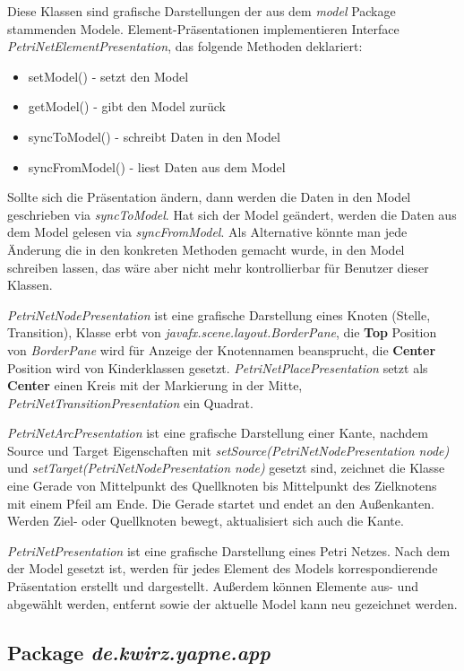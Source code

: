 \documentclass[12pt]{article}
\begin{document}
Diese Klassen sind grafische Darstellungen der aus dem \emph{model} Package stammenden Modele. Element-Präsentationen implementieren Interface
\emph{PetriNetElementPresentation}, das folgende Methoden deklariert:
\begin{itemize}
\item{setModel() - setzt den Model}
\item{getModel() - gibt den Model zurück}
\item{syncToModel() - schreibt Daten in den Model}
\item{syncFromModel() - liest Daten aus dem Model}
\end{itemize}
Sollte sich die Präsentation ändern, dann werden die Daten in den Model geschrieben via \emph{syncToModel}. Hat sich der Model geändert, werden die Daten aus dem Model gelesen via \emph{syncFromModel}. Als Alternative könnte man jede Änderung die in den konkreten Methoden gemacht wurde, in den Model schreiben lassen, das wäre aber nicht mehr kontrollierbar für Benutzer dieser Klassen.

\emph{PetriNetNodePresentation} ist eine grafische Darstellung eines Knoten (Stelle, Transition), Klasse erbt von \emph{javafx.scene.layout.BorderPane}, die \textbf{Top} Position von \emph{BorderPane} wird für Anzeige der Knotennamen beansprucht, die \textbf{Center} Position wird von Kinderklassen gesetzt. \emph{PetriNetPlacePresentation} setzt als \textbf{Center} einen Kreis mit der Markierung in der Mitte, \emph{PetriNetTransitionPresentation} ein Quadrat.

\emph{PetriNetArcPresentation} ist eine grafische Darstellung einer Kante, nachdem Source und Target Eigenschaften mit \emph{setSource(PetriNetNodePresentation node)} und \emph{setTarget(PetriNetNodePresentation node)} gesetzt sind, zeichnet die Klasse eine Gerade von Mittelpunkt des Quellknoten bis Mittelpunkt des Zielknotens mit einem Pfeil am Ende. Die Gerade startet und endet an den Außenkanten. Werden Ziel- oder Quellknoten bewegt, aktualisiert sich auch die Kante.

\emph{PetriNetPresentation} ist eine grafische Darstellung eines Petri Netzes. Nach dem der Model gesetzt ist, werden für jedes Element des Models korrespondierende Präsentation erstellt und dargestellt. Außerdem können Elemente aus- und abgewählt werden, entfernt sowie der aktuelle Model kann neu gezeichnet werden.

\subsection{Package \emph{de.kwirz.yapne.app}}
\end{document}
